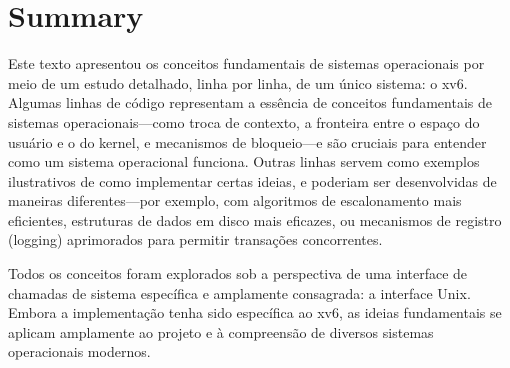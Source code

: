 \chapter{Summary}
\label{CH:SUM}

Este texto apresentou os conceitos fundamentais de sistemas operacionais por meio de um estudo detalhado, linha por linha, de um único sistema: o xv6. Algumas linhas de código representam a essência de conceitos fundamentais de sistemas operacionais—como troca de contexto, a fronteira entre o espaço do usuário e o do kernel, e mecanismos de bloqueio—e são cruciais para entender como um sistema operacional funciona. Outras linhas servem como exemplos ilustrativos de como implementar certas ideias, e poderiam ser desenvolvidas de maneiras diferentes—por exemplo, com algoritmos de escalonamento mais eficientes, estruturas de dados em disco mais eficazes, ou mecanismos de registro (logging) aprimorados para permitir transações concorrentes.

Todos os conceitos foram explorados sob a perspectiva de uma interface de chamadas de sistema específica e amplamente consagrada: a interface Unix. Embora a implementação tenha sido específica ao xv6, as ideias fundamentais se aplicam amplamente ao projeto e à compreensão de diversos sistemas operacionais modernos.
